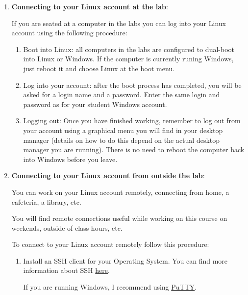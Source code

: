 \documentclass[a4paper, 12pt]{article}
\begin{document}
\begin{enumerate}

  \item \textbf{Connecting to your Linux account at the lab}:

  If you are seated at a computer in the labs you can log into your Linux
  account using the following procedure:

  \begin{enumerate}

    \item Boot into Linux: all computers in the labs are configured to
      dual-boot into Linux or Windows. If the computer is currently runing
      Windows, just reboot it and choose Linux at the boot menu.

    \item Log into your account: after the boot process has completed, you
      will be asked for a login name and a password. Enter the same login and
      password as for your student Windows account.

    \item Logging out: Once you have finished working, remember to log out from
      your account using a graphical menu you will find in your desktop manager
      (details on how to do this depend on the actual desktop manager you are
      running). There is no need to reboot the computer back into Windows
      before you leave.

  \end{enumerate}

  \item \textbf{Connecting to your Linux account from outside the lab}:

  You can work on your Linux account remotely, connecting from home, a
  cafeteria, a library, etc.

  You will find remote connections useful while working on this course on
  weekends, outside of class hours, etc.

  To connect to your Linux account remotely follow this procedure:

  \begin{enumerate}

    \item Install an SSH client for your Operating System. You can find more
      information about SSH
      \href{http://en.wikipedia.org/wiki/Secure_Shell}{here}.

      If you are running Windows, I recommend using
      \href{http://www.chiark.greenend.org.uk/~sgtatham/putty/download.html}{PuTTY}.


\end{enumerate}
\end{enumerate}
\end{document}
